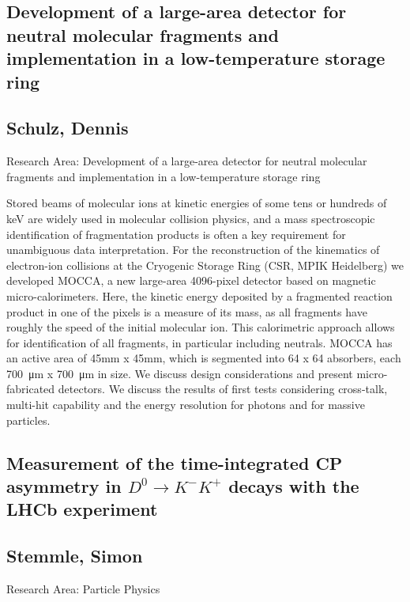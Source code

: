\subsection*{\centering \large Development of a large-area detector for neutral molecular fragments and implementation in a low-temperature storage ring}
\subsection*{\centering \normalsize Schulz, Dennis}
Research Area: Development of a large-area detector for neutral molecular fragments and implementation in a low-temperature storage ring\newline

\noindent Stored beams of molecular ions at kinetic energies of some tens or hundreds of keV are widely used in molecular collision physics, and a mass spectroscopic identification of fragmentation products is often a key requirement for unambiguous data interpretation. For the reconstruction of the kinematics of electron-ion collisions at the Cryogenic Storage Ring (CSR, MPIK Heidelberg) we developed MOCCA, a new large-area 4096-pixel detector based on magnetic micro-calorimeters. Here, the kinetic energy deposited by a fragmented reaction product in one of the pixels is a measure of its mass, as all fragments have roughly the speed of the initial molecular ion. This calorimetric approach allows for identification of all fragments, in particular including neutrals. MOCCA has an active area of 45mm x 45mm, which is segmented into 64 x 64 absorbers, each \SI{700}{\micro m} x \SI{700}{\micro m} in size.
\newline
We discuss design considerations and present micro-fabricated detectors. We discuss the results of first tests considering cross-talk, multi-hit capability and the energy resolution for photons and for massive particles.
\subsection*{\centering \large Measurement of the time-integrated CP asymmetry in $D^0\rightarrow K^-K^+$ decays with the LHCb experiment}
\subsection*{\centering \normalsize Stemmle, Simon}
Research Area: Particle Physics\newline

